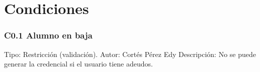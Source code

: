 \chapter{Condiciones}
\label{appendix:Condiciones}

\subsection{C0.1 Alumno en baja }
	\UCli Tipo: Restricción (validación).
	\UCli Autor: Cortés Pérez Edy
	\UCli Descripción: No se puede generar la credencial si el usuario tiene adeudos.
	
















